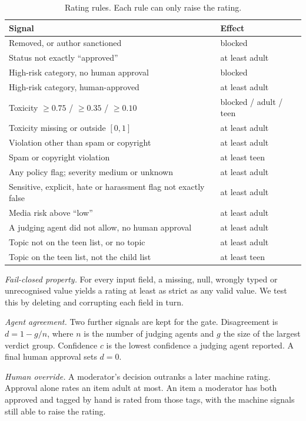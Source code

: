 \documentclass[conference]{IEEEtran}
\begin{document}
\begin{table}[t]
\caption{Rating rules. Each rule can only raise the rating.}
\label{tab:rating}
\centering
\footnotesize
\begin{tabular}{@{}p{}p{}@{}}
\toprule
Signal & Effect \\
\midrule
Removed, or author sanctioned & blocked \\
Status not exactly ``approved'' & at least adult \\
High-risk category, no human approval & blocked \\
High-risk category, human-approved & at least adult \\
Toxicity $\ge 0.75$ / $\ge 0.35$ / $\ge 0.10$ & blocked / adult / teen \\
Toxicity missing or outside $[0,1]$ & at least adult \\
Violation other than spam or copyright & at least adult \\
Spam or copyright violation & at least teen \\
Any policy flag; severity medium or unknown & at least adult \\
Sensitive, explicit, hate or harassment flag not exactly false & at least adult \\
Media risk above ``low'' & at least adult \\
A judging agent did not allow, no human approval & at least adult \\
Topic not on the teen list, or no topic & at least adult \\
Topic on the teen list, not the child list & at least teen \\
\bottomrule
\end{tabular}
\end{table}

\emph{Fail-closed property.} For every input field, a missing, null, wrongly typed or unrecognised value yields a rating at least as strict as any valid value. We test this by deleting and corrupting each field in turn.

\emph{Agent agreement.} Two further signals are kept for the gate. Disagreement is $d = 1 - g/n$, where $n$ is the number of judging agents and $g$ the size of the largest verdict group. Confidence $c$ is the lowest confidence a judging agent reported. A final human approval sets $d = 0$.

\emph{Human override.} A moderator's decision outranks a later machine rating. Approval alone rates an item adult at most. An item a moderator has both approved and tagged by hand is rated from those tags, with the machine signals still able to raise the rating.
\end{document}
